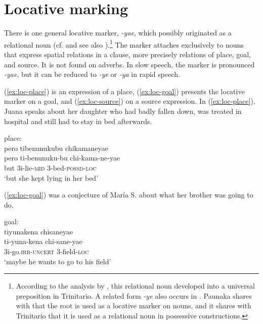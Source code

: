 
\section{Locative marking}\label{sec:Locative}

There is one general locative marker, \textit{-yae}, which possibly originated as a relational noun (cf. \citealt[]{Rose2019a} and see also ).\footnote{According to the analysis by \citet[]{Rose2019a}, this relational noun developed into a universal preposition in Trinitario. A related form \textit{-ye} also occurs in  \citep[cf.][150]{Danielsen2007}. Paunaka shares with  that the root is used as a locative marker on nouns, and it shares with Trinitario that it is used as a relational noun in possessive constructions.} The marker attaches exclusively to nouns that express spatial relations in a clause, more precisely relations of place, goal, and source. It is not found on adverbs. In slow speech, the marker is pronounced \textit{-yae}, but it can be reduced to \textit{-ye} or \textit{-ya} in rapid speech. 

(\ref{ex:loc-place}) is an expression of a place, (\ref{ex:loc-goal}) presents the locative marker on a goal, and (\ref{ex:loc-source}) on a source expression. In (\ref{ex:loc-place}), Juana speaks about her daughter who had badly fallen down, was treated in hospital and still had to stay in bed afterwards.

\ea\label{ex:loc-place}
\begingl
\glpreamble \textup{place:}\\pero tibenunukubu chikamaneyae\\
\gla pero ti-benunuku-bu chi-kama-ne-yae\\
\glb but 3i-lie-\textsc{mid} 3-bed-\textsc{possd}-\textsc{loc}\\
\glft ‘but she kept lying in her bed’
\endgl
\trailingcitation{[jxx-p110923l-1.485]}
\xe

(\ref{ex:loc-goal}) was a conjecture of María S. about what her brother was going to do.

\ea\label{ex:loc-goal}
\begingl
\glpreamble \textup{goal:}\\tiyunakena chisaneyae\\
\gla ti-yuna-kena chi-sane-yae\\ 
\glb 3i-go.\textsc{irr}-\textsc{uncert} 3-field-\textsc{loc}\\ 
\glft ‘maybe he wants to go to his field’\\ 
\endgl
\trailingcitation{[rxx-e120511l.348]}
\xe

